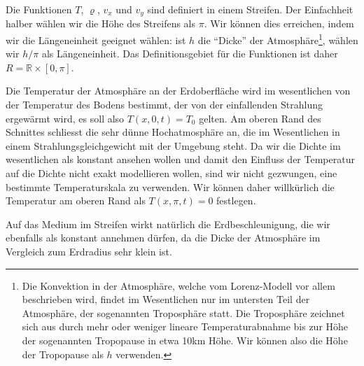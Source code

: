 Die Funktionen $T$, $\varrho$, $v_x$ und $v_y$ sind definiert in einem
Streifen.
Der Einfachheit halber wählen wir die Höhe des Streifens als $\pi$.
Wir können dies erreichen, indem wir die Längeneinheit geeignet wählen:
ist $h$ die ``Dicke'' der Atmosphäre\footnote{Die Konvektion in der Atmosphäre,
welche vom Lorenz-Modell vor allem beschrieben wird, findet im Wesentlichen
nur im untersten Teil der Atmosphäre, der sogenannten Troposphäre statt.
Die Troposphäre zeichnet sich aus durch mehr oder weniger lineare
Temperaturabnahme bis zur Höhe der sogenannten Tropopause in etwa
10km Höhe.
Wir können also die Höhe der Tropopause als $h$ verwenden.}, wählen wir
$h/\pi$ als Längeneinheit.
Das Definitionsgebiet für die Funktionen ist daher $R=\mathbb R\times [0,\pi]$.

Die Temperatur der Atmosphäre an der Erdoberfläche wird im wesentlichen von
der Temperatur des Bodens bestimmt, der von der einfallenden Strahlung
ergewärmt wird, es soll also $T(x,0,t)=T_0$ gelten.
Am oberen Rand des Schnittes schliesst die sehr dünne Hochatmosphäre an,
die im Wesentlichen in einem Strahlungsgleichgewicht mit der Umgebung steht.
Da wir die Dichte im wesentlichen als konstant ansehen wollen und damit
den Einfluss der Temperatur auf die Dichte nicht exakt modellieren wollen,
sind wir nicht gezwungen, eine bestimmte Temperaturskala zu verwenden.
Wir können daher willkürlich die Temperatur am oberen Rand als
$T(x,\pi,t)=0$ festlegen.

Auf das Medium im Streifen wirkt natürlich die Erdbeschleunigung,
die wir ebenfalls als konstant annehmen dürfen, da die Dicke der 
Atmosphäre im Vergleich zum Erdradius sehr klein ist.

